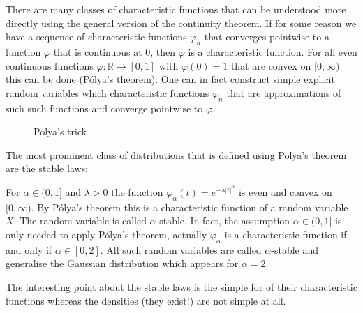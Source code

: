 There are many classes of characteristic functions that can be understood more directly using the general version of the continuity theorem. If for some reason we have a sequence of characteristic functions $\varphi_n$ that converges pointwise to a function $\varphi$ that is continuous at $0$, then $\varphi$ is a characteristic function. For all even continuous functions $\varphi \colon \mathbb{R} \to [0,1]$ with $\varphi(0)=1$ that are convex on $[0,\infty)$ this can be done (P\'olya's theorem). One can in fact construct simple explicit random variables which characteristic functions $\varphi_n$ that are  approximations of such such functions and converge pointwise to $\varphi$.

\begin{figure}
	\begin{center}
	\caption*{Polya's trick}
\end{center}
	\end{figure}

The most prominent class of distributions that is defined using Polya's theorem are the stable laws:
\begin{example}
	For $\alpha\in (0,1]$ and $\lambda>0$ the function $\varphi_{\alpha}(t) = e^{- \lambda \lvert t \rvert^{\alpha}}$ is even and convex on $[0,\infty)$. By P\'olya's theorem this is a characteristic function of a random variable $X$. The random variable is called $\alpha$-stable. In fact, the assumption $\alpha\in (0,1]$ is only needed to apply P\'olya's theorem, actually $\varphi_\alpha$ is a characteristic function if and only if $\alpha\in [0,2]$. All such random variables are called $\alpha$-stable and generalise the Gaussian distribution which appears for $\alpha=2$.
\end{example}
The interesting point about the stable laws is the simple for of their characteristic functions whereas the densities (they exist!) are not simple at all.


